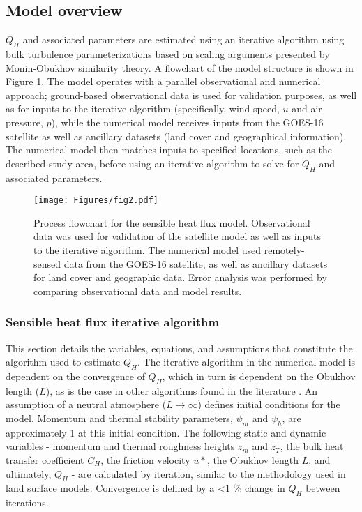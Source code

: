 \FloatBarrier

\subsection{Model overview}

$Q_H$ and associated parameters are estimated using an iterative algorithm using bulk turbulence parameterizations based on scaling arguments presented by Monin-Obukhov similarity theory. A flowchart of the model structure is shown in Figure \ref{fig:flowchart}. The model operates with a parallel observational and numerical approach; ground-based observational data is used for validation purposes, as well as for inputs to the iterative algorithm (specifically, wind speed, $u$ and air pressure, $p$), while the numerical model receives inputs from the GOES-16 satellite as well as ancillary datasets (land cover and geographical information). The numerical model then matches inputs to specified locations, such as the described study area, before using an iterative algorithm to solve for $Q_H$ and associated parameters.

\begin{figure}[!h]
    \centering
      \texttt{[image: Figures/fig2.pdf]}
      \caption{Process flowchart for the sensible heat flux model. Observational data was used for validation of the satellite model as well as inputs to the iterative algorithm. The numerical model used remotely-sensed data from the GOES-16 satellite, as well as ancillary datasets for land cover and geographic data. Error analysis was performed by comparing observational data and model results.}
      \label{fig:flowchart}
\end{figure}

\FloatBarrier

\subsubsection{Sensible heat flux iterative algorithm}

This section details the variables, equations, and assumptions that constitute the algorithm used to estimate $Q_H$. The iterative algorithm in the numerical model is dependent on the convergence of $Q_H$, which in turn is dependent on the Obukhov length ($L$), as is the case in other algorithms found in the literature \citep{Grimmond_1994, Launiainen_1990}. An assumption of a neutral atmosphere ($L \rightarrow \infty$) defines initial conditions for the model. Momentum and thermal stability parameters, $\psi_m$ and $\psi_h$, are approximately 1 at this initial condition. The following static and dynamic variables - momentum and thermal roughness heights $z_m$ and $z_T$, the bulk heat transfer coefficient $C_H$, the friction velocity $u*$, the Obukhov length $L$, and ultimately, $Q_H$ - are calculated by iteration, similar to the methodology used in land surface models. Convergence is defined by a \textless 1 \% change in $Q_H$ between iterations. 


